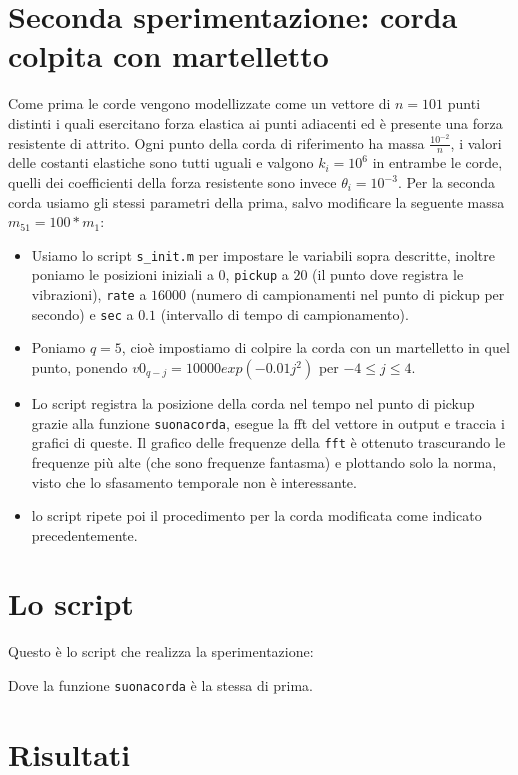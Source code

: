 \documentclass{article}
\begin{document}
	\section{Seconda sperimentazione: corda colpita con martelletto}
	Come prima le corde vengono modellizzate come un vettore di $n=101$ punti distinti i quali esercitano forza elastica ai punti adiacenti ed è presente una forza resistente di attrito. Ogni punto della corda di riferimento ha massa $\frac{10^{-2}}{n}$, i valori delle costanti elastiche sono tutti uguali e valgono $k_i=10^6$ in entrambe le corde, quelli dei coefficienti della forza resistente sono invece $\theta_i=10^{-3}$. Per la seconda corda usiamo gli stessi parametri della prima, salvo modificare la seguente massa $m_51=100*m_1$:\\
	\begin{itemize}
	\item Usiamo lo script {\tt s\_init.m} per impostare le variabili sopra descritte, inoltre poniamo le posizioni iniziali a $0$, {\tt pickup} a $20$ (il punto dove registra le vibrazioni), {\tt rate} a $16000$ (numero di campionamenti nel punto di pickup per secondo) e {\tt sec} a $0.1$ (intervallo di tempo di campionamento).
	\item Poniamo $q=5$, cioè impostiamo di colpire la corda con un martelletto in quel punto, ponendo $v0_{q-j}=10000 exp(-0.01 j^2)$ per $-4 \leq j \leq 4$.
	\item Lo script registra la posizione della corda nel tempo nel punto di pickup grazie alla funzione {\tt suonacorda}, esegue la fft del vettore in output e traccia i grafici di queste. Il grafico delle frequenze della {\tt fft} è ottenuto trascurando le frequenze più alte (che sono frequenze fantasma) e plottando solo la norma, visto che lo sfasamento temporale non è interessante.  
	\item lo script ripete poi il procedimento per la corda modificata come indicato precedentemente.
	\end{itemize}

	\section{Lo script}
	Questo è lo script che realizza la sperimentazione:
	
	
	
	Dove la funzione {\tt suonacorda} è la stessa di prima.
	
	\section{Risultati}
	
\end{document}
